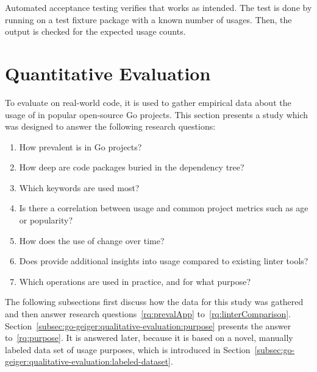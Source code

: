 Automated acceptance testing verifies that \toolGeiger{} works as intended.
The test is done by running \toolGeiger{} on a test fixture package with a known number of \unsafe{} usages.
Then, the output is checked for the expected usage counts.



\section{Quantitative Evaluation}\label{sec:go-geiger:quantitative-evaluation}

To evaluate \toolGeiger{} on real-world code, it is used to gather empirical data about the usage of \unsafe{} in
popular open-source Go projects.
This section presents a study which was designed to answer the following research questions:

\begin{enumerate}[left=0.5cm, label={RQ\arabic*}]
    \item How prevalent is \unsafe{} in Go projects? \label{rq:prevalApp}
    \item How deep are \unsafe{} code packages buried in the dependency tree? \label{rq:depsDepth}
    \item Which \unsafe{} keywords are used most? \label{rq:distTypes}
    \item Is there a correlation between \unsafe{} usage and common project metrics such as age or popularity? \label{rq:popularity}
    \item How does the use of \unsafe{} change over time? \label{rq:changeTime}
    \item Does \toolGeiger{} provide additional insights into \unsafe{} usage compared to existing linter tools? \label{rq:linterComparison}
    \item Which \unsafe{} operations are used in practice, and for what purpose? \label{rq:purpose}
\end{enumerate}

The following subsections first discuss how the data for this study was gathered and then answer research
questions~\ref{rq:prevalApp} to~\ref{rq:linterComparison}.
Section~\ref{subsec:go-geiger:qualitative-evaluation:purpose} presents the answer to~\ref{rq:purpose}.
It is answered later, because it is based on a novel, manually labeled data set of \unsafe{} usage purposes, which is
introduced in Section~\ref{subsec:go-geiger:qualitative-evaluation:labeled-dataset}.


